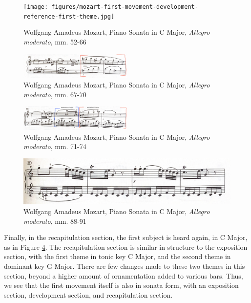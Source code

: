 \begin{figure}
    \centering
    \texttt{[image: figures/mozart-first-movement-development-reference-first-theme.jpg]}
    \caption{Wolfgang Amadeus Mozart, Piano Sonata in C Major, \textit{Allegro moderato}, mm. 52-66}
    \label{fig:mozart-first-movement-development-reference-first-theme}
\end{figure}

\begin{figure}
    \centering
    \includegraphics[width=0.5\textwidth]{figures/mozart-first-movement-modulation-a-major.jpg}
    \caption{Wolfgang Amadeus Mozart, Piano Sonata in C Major, \textit{Allegro moderato}, mm. 67-70}
    \label{fig:mozart-first-movement-modulation-a-major}
\end{figure}

\begin{figure}
    \centering
\includegraphics[width=0.5\textwidth]{figures/mozart-first-movement-f-major-d-minor.jpg}
    \caption{Wolfgang Amadeus Mozart, Piano Sonata in C Major, \textit{Allegro moderato}, mm. 71-74}
    \label{fig:mozart-first-movement-f-major-d-minor}
\end{figure}

\begin{figure}
    \centering
    \includegraphics[width=\textwidth]{figures/mozart-first-movement-recapitulation-first-theme.jpg}
    \caption{Wolfgang Amadeus Mozart, Piano Sonata in C Major, \textit{Allegro moderato}, mm. 88-91}
    \label{fig:mozart-first-movement-recapitulation-first-theme}
\end{figure}

Finally, in the recapitulation section, the first subject is heard again, in C Major, as in Figure \ref{fig:mozart-first-movement-recapitulation-first-theme}\autocite{Henle_1977}. The recapitulation section is similar in structure to the exposition section, with the first theme in tonic key C Major, and the second theme in dominant key G Major. There are few changes made to these two themes in this section, beyond a higher amount of ornamentation added to various bars. Thus, we see that the first movement itself is also in sonata form, with an exposition section, development section, and recapitulation section.

